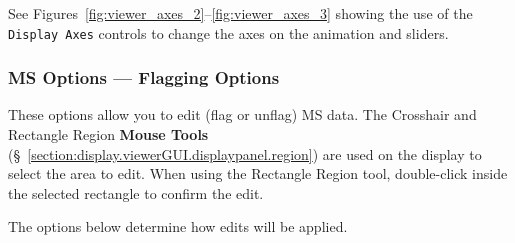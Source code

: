 See Figures~\ref{fig:viewer_axes_2}--\ref{fig:viewer_axes_3}
showing the use of the {\tt Display Axes} controls to change the axes on the
animation and sliders.

\subsubsection{MS Options --- Flagging Options}
\label{section:display.ms.adjust.flagging}

These options allow you to edit (flag or unflag) MS data.
The Crosshair and Rectangle Region {\bf Mouse Tools}
(\S~\ref{section:display.viewerGUI.displaypanel.region}) are used on
the display to select the area to edit.  When using the Rectangle Region
tool, double-click inside the selected rectangle to confirm the edit.

The options below determine how edits will be applied.

